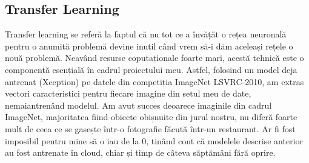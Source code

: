 \subsection{Transfer Learning}
Transfer learning se referă la faptul că nu tot ce a învățăt o rețea neuronală pentru o anumită problemă devine inutil când vrem să-i dăm aceleași rețele o nouă problemă. Neavând resurse coputaționale foarte mari, acestă tehnică este o componentă esențială în cadrul proiectului meu. Astfel, folosind un model deja antrenat (Xception) pe datele din competiția ImageNet LSVRC-2010, am extras vectori caracteristici pentru fiecare imagine din setul meu de date, nemaiantrenând modelul. Am avut succes deoarece imaginile din cadrul ImageNet, majoritatea fiind obiecte obișnuite din jurul nostru, nu diferă foarte mult de ceea ce se gasește într-o fotografie făcută într-un restaurant. Ar fi fost imposibil pentru mine să o iau de la 0, tinând cont că modelele descrise anterior au fost antrenate în cloud, chiar și timp de câteva săptămâni fără oprire.